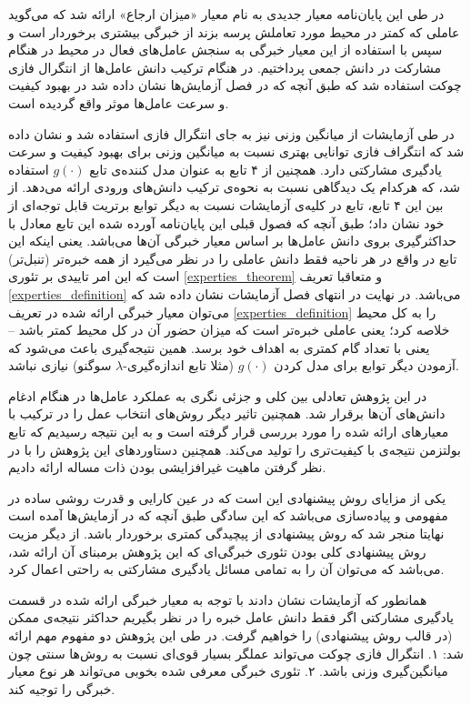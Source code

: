 در طی این پایان‌نامه معیار جدیدی به نام معیار «میزان ارجاع» ارائه شد که می‌گوید عاملی که کمتر در محیط مورد تعاملش پرسه بزند از خبرگی بیشتری برخوردار است و سپس با استفاده از این معیار خبرگی به سنجش عامل‌های فعال در محیط در هنگام مشارکت در دانش جمعی پرداختیم. در هنگام ترکیب دانش عامل‌ها از انتگرال فازی چوکت استفاده شد که طبق آنچه که در فصل آزمایش‌ها نشان‌ داده شد در بهبود کیفیت و سرعت عامل‌ها موثر واقع گردیده است.

در طی آزمایشات از میانگین وزنی نیز به جای انتگرال فازی استفاده شد و نشان داده شد که انتگراف فازی توانایی بهتری نسبت به میانگین وزنی برای بهبود کیفیت و سرعت یادگیری مشارکتی دارد. همچنین از ۴ تابع به عنوان مدل کننده‌ی تابع $g(\cdot)$ استفاده شد، که هرکدام یک دیدگاهی نسبت به نحوه‌ی ترکیب دانش‌های ورودی ارائه می‌دهد. از بین این ۴ تابع، تابع  در کلیه‌ی آزمایشات نسبت به دیگر توابع برتریت قابل توجه‌ای از خود نشان داد؛ طبق آنچه که فصول قبلی این پایان‌نامه آورده شده این تابع معادل با حداکثرگیری بروی دانش عامل‌ها بر اساس معیار خبرگی آن‌ها می‌باشد. یعنی اینکه این تابع در واقع در هر ناحیه فقط دانش عاملی را در نظر می‌گیرد از همه خبره‌تر (تنبل‌تر) است که این امر تاییدی بر تئوری
\ref{experties_theorem}
و متعاقبا تعریف
\ref{experties_definition}
می‌باشد. در نهایت در انتهای فصل آزمایشات نشان داده شد که می‌توان معیار خبرگی ارائه شده در تعریف
\ref{experties_definition}
را به کل محیط خلاصه کرد؛ یعنی عاملی خبره‌تر است که میزان حضور آن در کل محیط کمتر باشد -- یعنی با تعداد گام کمتری به اهداف خود برسد. همین نتیجه‌گیری باعث می‌شود که آزمودن دیگر توابع برای مدل کردن $g(\cdot)$ (مثلا تابع اندازه‌گیری-$\lambda$ سوگنو) نیازی نباشد.

در این پژوهش تعادلی بین کلی و جزئی نگری به عملکرد عامل‌ها در هنگام ادغام دانش‌های آن‌ها برقرار شد. همچنین تاثیر دیگر روش‌های انتخاب عمل را در ترکیب با معیار‌های ارائه شده را مورد بررسی قرار گرفته است و به این نتیجه رسیدیم که تابع بولتزمن نتیجه‌ی با کیفیت‌تری را تولید می‌کند. همچنین دستاورد‌های این پژوهش را با در نظر گرفتن ماهیت غیرافزایشی بودن ذات مساله ارائه دادیم.

یکی از مزایای روش پیشنهادی این است که در عین کارایی و قدرت روشی ساده در مفهومی و پیاده‌سازی می‌باشد که این سادگی طبق آنچه که در آزمایش‌ها آمده است نهایتا منجر شد که روش پیشنهادی از پیچیدگی کمتری برخوردار باشد. از دیگر مزیت روش پیشنهادی کلی بودن تئوری خبرگی‌ای که این پژوهش برمبنای آن ارائه شد، می‌باشد که می‌توان آن را به تمامی مسائل یادگیری مشارکتی به راحتی اعمال کرد.

همانطور که آزمایشات نشان دادند با توجه به معیار خبرگی ارائه شده در قسمت یادگیری مشارکتی اگر فقط دانش عامل خبره را در نظر بگیریم حداکثر نتیجه‌ی ممکن (در قالب روش پیشنهادی) را خواهیم گرفت. در طی این پژوهش دو مفهوم مهم ارائه شد: ۱. انتگرال فازی چوکت می‌تواند عملگر بسیار قوی‌ای نسبت به روش‌ها سنتی چون میانگین‌گیری وزنی باشد. ۲. تئوری خبرگی معرفی شده بخوبی می‌تواند هر نوع معیار خبرگی را توجیه کند.

